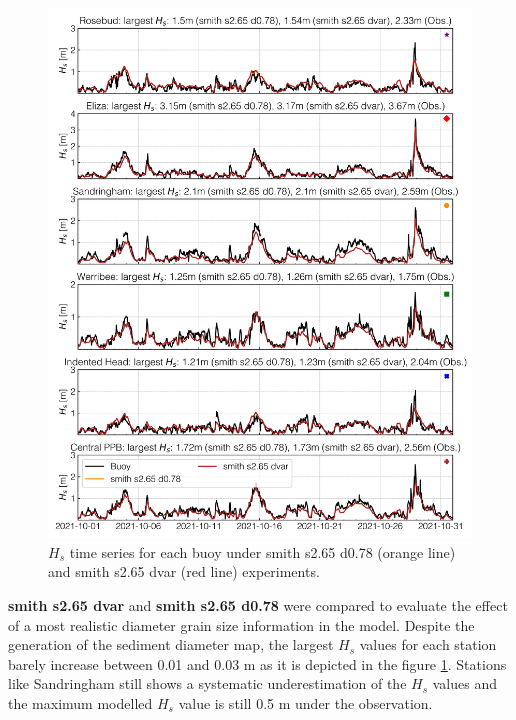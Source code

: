 \documentclass[12pt]{article}
\begin{document}
\begin{figure}[h]
    \centering
    \includegraphics[scale=0.7]{plots/hs_series/smith s2.65 d0.78_vs_smith s2.65 dvar_vert.png}
    \caption{$H_{s}$ time series for each buoy under smith s2.65 d0.78 (orange line) and smith s2.65 dvar (red line) experiments.}
    \label{fig:hs_smith_0.78_vs_smith_dvar}
\end{figure}

\textbf{smith s2.65 dvar} and \textbf{smith s2.65 d0.78} were compared to evaluate the effect of a most realistic diameter grain size information in the model. Despite the generation of the sediment diameter map, the largest $H_s$ values for each station barely increase between 0.01 and 0.03 m as it is depicted in the figure \ref{fig:hs_smith_0.78_vs_smith_dvar}. Stations like Sandringham still shows a systematic underestimation of the $H_s$ values and the maximum modelled $H_s$ value is still 0.5 m under the observation. 
\end{document}
